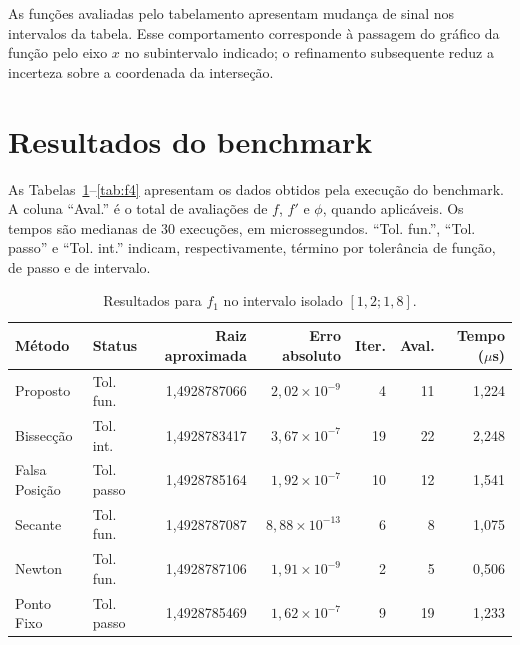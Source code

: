 \documentclass[12pt,a4paper]{article}
\begin{document}
As funções avaliadas pelo tabelamento apresentam mudança de sinal nos intervalos da tabela. Esse comportamento corresponde à passagem do gráfico da função pelo eixo $x$ no subintervalo indicado; o refinamento subsequente reduz a incerteza sobre a coordenada da interseção.

\section{Resultados do benchmark}

As Tabelas~\ref{tab:f1}--\ref{tab:f4} apresentam os dados obtidos pela execução do benchmark. A coluna ``Aval.'' é o total de avaliações de $f$, $f'$ e $\phi$, quando aplicáveis. Os tempos são medianas de 30 execuções, em microssegundos. ``Tol. fun.'', ``Tol. passo'' e ``Tol. int.'' indicam, respectivamente, término por tolerância de função, de passo e de intervalo.

\begin{table}[H]
\centering
\caption{Resultados para $f_1$ no intervalo isolado $[1,2;1,8]$.}
\label{tab:f1}
\small
\begin{tabular}{l l r r r r r}
\toprule
Método & Status & Raiz aproximada & Erro absoluto & Iter. & Aval. & Tempo ($\mu$s) \\
\midrule
Proposto & Tol. fun. & 1,4928787066 & $2,02\times10^{-9}$ & 4 & 11 & 1,224 \\
Bissecção & Tol. int. & 1,4928783417 & $3,67\times10^{-7}$ & 19 & 22 & 2,248 \\
Falsa Posição & Tol. passo & 1,4928785164 & $1,92\times10^{-7}$ & 10 & 12 & 1,541 \\
Secante & Tol. fun. & 1,4928787087 & $8,88\times10^{-13}$ & 6 & 8 & 1,075 \\
Newton & Tol. fun. & 1,4928787106 & $1,91\times10^{-9}$ & 2 & 5 & 0,506 \\
Ponto Fixo & Tol. passo & 1,4928785469 & $1,62\times10^{-7}$ & 9 & 19 & 1,233 \\
\bottomrule
\end{tabular}
\end{table}
\end{document}

